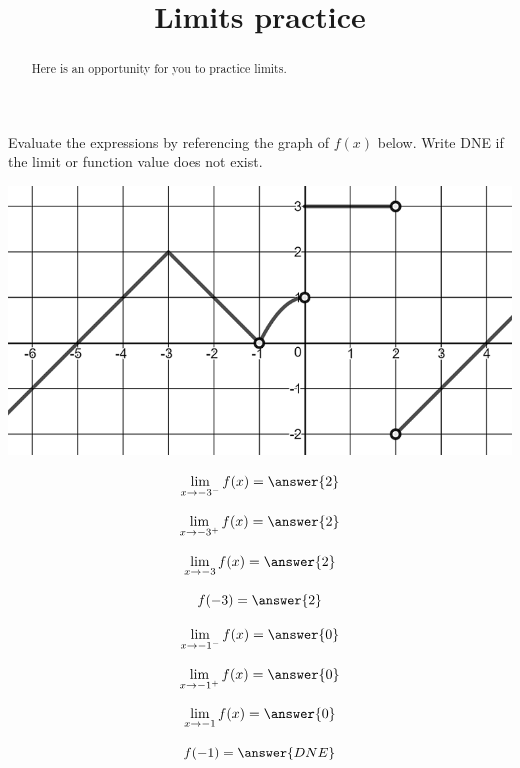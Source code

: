 \documentclass[handout]{ximera}
\title{Limits practice}
\begin{document}
\begin{abstract}
Here is an opportunity for you to practice limits.
\end{abstract}
\maketitle

\begin{exercise}
  Evaluate the expressions by referencing the graph of $f(x)$ below. Write DNE if the limit or function value does not exist.
  
\begin{center} \includegraphics[scale=0.5]{limgraph.png} \end{center}

\begin{enumerate}

\begin{multicols}{3}
\item \[ \displaystyle\lim_{x\to -3^-} f(x) =\answer{2} \]

\item \[ \displaystyle\lim_{x\to -3^+} f(x) = \answer{2} \] 

\item \[ \displaystyle\lim_{x\to -3} f(x) = \answer{2} \]

\item \[ f(-3) = \answer{2} \]

\item \[ \displaystyle\lim_{x\to -1^-} f(x) =\answer{0} \]

\item \[ \displaystyle\lim_{x\to -1^+} f(x) = \answer{0} \]

\item \[ \displaystyle\lim_{x\to -1} f(x) = \answer{0} \]

\item \[ f(-1) = \answer{DNE} \]


\end{multicols}
\end{enumerate}
\end{exercise}
\end{document}
